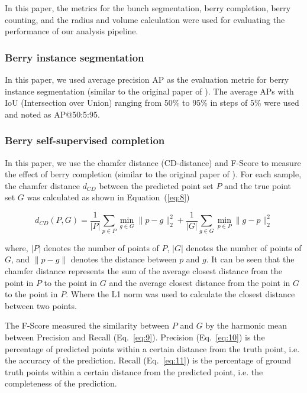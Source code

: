 \documentclass[12pt]{article}
\begin{document}
In this paper, the metrics for the bunch segmentation, berry completion, berry counting, and the radius and volume calculation were used for evaluating the performance of our analysis pipeline.

\subsubsection{Berry instance segmentation}
\label{sec:251}
In this paper, we used average precision AP as the evaluation metric for berry instance segmentation (similar to the original paper of \citep{vu_softgroup_2022}). The average APs with IoU (Intersection over Union) ranging from 50\% to 95\% in steps of 5\% were used and noted as AP@50:5:95.

\subsubsection{Berry self-supervised completion}

In this paper, we use the chamfer distance (CD-distance) and F-Score to measure the effect of berry completion (similar to the original paper of \citep{yu_pointr_2021}). 
For each sample, the chamfer distance $d_{CD}$ between the predicted point set $P$ and the true point set $G$ was calculated as shown in Equation~(\ref{eq:8})

\begin{equation}
    d_{CD}(P, G) = \frac{1}{|P|} \sum_{p \in P} \min_{g \in G} \|p - g\|_2^2 + \frac{1}{|G|} \sum_{g \in G} \min_{p \in P} \|g - p\|_2^2
    \label{eq:8}
\end{equation}

{\raggedright where, $|P|$ denotes the number of points of $P$, $|G|$ denotes the number of points of $G$, and $\|p - g\|$ denotes the distance between $p$ and $g$. 
It can be seen that the chamfer distance represents the sum of the average closest distance from the point in $P$ to the point in $G$ and the average closest distance from the point in $G$ to the point in $P$. Where the L1 norm was used to calculate the closest distance between two points.}

The F-Score measured the similarity between $P$ and $G$ by the harmonic mean between Precision and Recall (Eq.~\ref{eq:9}). 
Precision (Eq.~\ref{eq:10}) is the percentage of predicted points within a certain distance from the truth point, i.e. the accuracy of the prediction. Recall (Eq.~\ref{eq:11}) is the percentage of ground truth points within a certain distance from the predicted point, i.e. the completeness of the prediction. 
\end{document}
